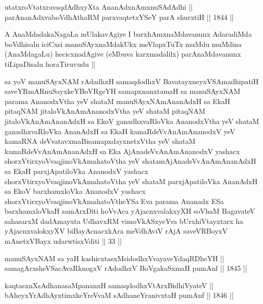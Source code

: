 \begin{shl}
utatxroVtatxravaqdAdhxyX\s ta AnanAdxnAmxnuSAdAdhi || \\
parAnanAdxvaboVdhAthaRM parxvaqtetxYSeY parA shurxtiH ||  1844 ||  
\end{shl}


\begin{artha}
A AnaMdadakaNagaLa mUlakavAgiye I barxhAmxnaMdavanunx AdaradiMda
boVdhisalu iciCxsi manuSAyxnaMdakUkx meVlapxTuTx muMdu muMdina
(AnaMdagaLu) hecicxnadAgive (eMbuva karxmadalilx) parAnaMdavanunx
tiLipaDisalu horaTiruvudu || 
\end{artha}


\begin{shl}
sa yoV manuSAyxNAM rAdadhxH samaqdodhxV BavatayxneyxVSAmadhipatiH saveYRmARnuSayxkeYBoVRgeYH samapxnanxtamaH sa manuSAyxNAM parama AnanodxV\s tha yeV shataM manuSAyxNAmAnanAdxH sa EkaH pitaqNAM jitaloVkAnAmAnanodxV\s tha yeV shataM pitaqNAM jitaloVkAnAmAnanAdxH sa EkoV ganadhxvaRloVka AnanodxV\s tha yeV shataM ganadhxvaRloVka AnanAdxH sa EkaH kamaRdeVvAnAmAnanodxV yeV kamaRNA deVvatavxmaBisamapxdayxnetxV\s tha yeV shataM kamaRdeVvAnAmAnanAdxH sa Eka AjAnadeVvAnAmAnanodxV yashacx shorxVtirxyoV\s vaqjinoV\s kAmahatoV\s tha yeV shatamAjAnadeVvAnAmAnanAdxH sa EkaH parxjApatiloVka AnanodxV yashacx shorxVtirxyoV\s vaqjinoV\s kAmahatoV\s tha yeV shataM parxjApatiloVka AnanAdxH sa EkoV barxhamxloVka AnanodxV yashacx shorxVtirxyoV\s vaqjinoV\s kAmahatoV\s theYSa Eva parama Ananadx ESa barxhamxloVkaH samArxDiti hoVvAca yAjacnxvalakxyXH soVhaM BagavateV sahasarxM dadAmayxta UdhavxRM vimoVkASxyeYva bUrxhiVtayxtarx ha yAjacnxvalokxyXV biBayAcnacxkAra meVdhAviV rAjA saveVRBoyxV mAnetxVBayx udarwtisxVditi || 33 ||
\end{shl}


\begin{shl}
manuSAyxNAM sa yaH kashicxtasxMsidodhxV\s vayaveYdaqRDheYH || \\
samagArxsheVSacAvaRknogxV rAdodhxV BoVgakaSxmaH pumAnf ||  1845 ||  
\end{shl}
				
\begin{shl}
kaqtasxnXsAdhanasaMpananxH samaqdodhxV\s tArxBidhiVyateV || \\
bAheyxYrAdhAyxtimxkeYreVvaM sAdhaneYranivxtaH pumAnf ||  1846 ||  
\end{shl}

